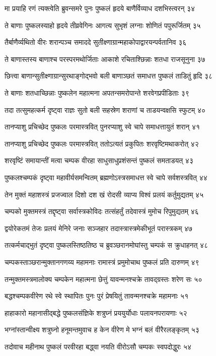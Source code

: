 मा प्रयाहि रणं त्यक्त्वेति ब्रुवन्समरे पुनः
पुष्कलं हृदये बाणैर्विव्याध दशभिस्त्वरन् ३४

ते बाणाः पुष्कलस्याहो हृदये तीव्रवेगिनः
आगत्य सुभृशं लग्नाः शोणितं पपुरूर्जितम् ३५

तैर्बाणैर्व्यथितो वीरः शरान्पञ्च समाददे
सुतीक्ष्णाग्रान्महाकोपाद्वारयन्पर्वतानिव ३६

ते बाणास्तस्य बाणाश्च परस्परमथोर्जिताः
आकाशे रचिताश्छिन्नाः शतधा राजसूनुना ३७

छित्त्वा बाणान्सुतीक्ष्णाग्रान्सुरथाङ्गोद्भवो बली
बाणाञ्छतं समाधत्त पुष्कलं ताडितुं हृदि ३८

ते बाणाः शतधाच्छिन्नाः पुष्कलेन महात्मना
अपतन्समरोपान्ते शरवेगप्रपीडिताः ३९

तदा तत्सुमहत्कर्म दृष्ट्वा राज्ञः सुतो बली
सहस्रेण शराणां च ताडयन्वक्षसि स्फुटम् ४०

तानप्याशु प्रचिच्छेद पुष्कलः परमास्त्रवित्
पुनरप्याशु स्वे चापे समाधत्तायुतं शरान् ४१

तानप्याशु प्रचिच्छेद पुष्कलः परमास्त्रवित्
ततोऽत्यतं प्रकुपितः शरवृष्टिमथाकरोत् ४२

शरवृष्टिं समायान्तीं मत्वा चम्पक वीरहा
साधुसाधुप्रशंसन्तं पुष्कलं समताडयत् ४३

पुष्कलश्चम्पकं दृष्ट्वा महावीर्यसमन्वितम्
ब्रह्मणोऽस्त्रसमाधत्त स्वे चापे सर्वशस्त्रवित् ४४

तेन मुक्तं महाशस्त्रं प्रजज्वाल दिशो दश
खं रोदसी व्याप्य विश्वं प्रलयं कर्तुमुद्यतम् ४५

चम्पको मुक्तमस्त्रं तद्दृष्ट्वा सर्वास्त्रकोविदः
तत्संहर्तुं तदेवास्त्रं मुमोच रिपुमुद्यतम् ४६

द्वयोरेकतमं तेजः प्रलयं मेनिरे जनाः
सञ्जहार तदास्त्रास्त्रमेकीभूतं परास्त्रकम् ४७

तत्कर्मचाद्भुतं दृष्ट्वा पुष्कलस्तिष्ठतिष्ठ च
ब्रुवञ्छरानमोघांस्तु चम्पकं स क्रुधाहनत् ४८

चम्पकस्ताञ्छरान्मुक्तानगणय्य महामनाः
रामास्त्रं प्रमुमोचाथ पुष्कलं प्रति दारुणम् ४९

तन्मुक्तमस्त्रमालोक्य चम्पकेन महात्मना
छेत्तुं यावन्मनश्चक्रे तावद्ग्रस्तः शरेण सः ५०

बद्धश्चम्पकवीरेण रथे स्वे स्थापितः पुनः
पुरं प्रेषयितुं तावन्मनश्चक्रे महामनाः ५१

हाहाकारो महानासीद्बद्धे पुष्कलसंज्ञिके
शत्रुघ्नं प्रययुर्योधाः पलायनपरायणाः ५२

भग्नांस्तान्वीक्ष्य शत्रुघ्नो हनूमन्तमुवाच ह
केन वीरेण मे भग्नं बलं वीरैरलङ्कृतम् ५३

तदोवाच महीनाथ पुष्कलं परवीरहा
बद्ध्वा नयति वीरोऽसौ चम्पकः स्वपदोद्धुरः ५४

